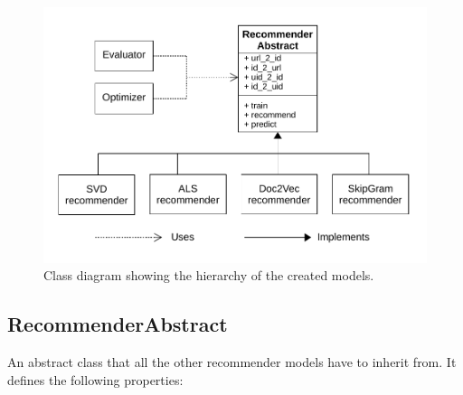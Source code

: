 \begin{figure}[H]
    \centering
    \includegraphics[scale=0.9]{obrazky-figures/class_diagram.pdf}
    \caption{Class diagram showing the hierarchy of the created models.}
    \label{fig:class_diagram}
\end{figure}

\subsection*{RecommenderAbstract}
An abstract class that all the other recommender models have to inherit from. It defines the following properties:

